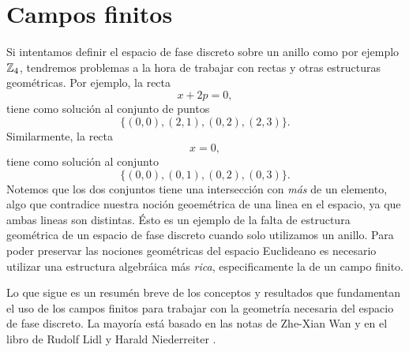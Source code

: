 \section{Campos finitos}
\label{sec:fields}

Si intentamos definir el espacio de fase discreto sobre un
anillo como por ejemplo $\operatorname{\mathbb{Z}}_4$, tendremos problemas a la
hora de trabajar con rectas y otras estructuras geométricas.
Por ejemplo, la recta
\[
  x + 2p = 0,
\]
tiene como solución al conjunto de puntos
\begin{equation}
  \label{eqn:ap_fields_1}
  \{(0,0), (2,1), (0,2), (2,3)\}.
\end{equation} 
Similarmente, la recta 
\[
  x = 0,
\] 
tiene como solución al conjunto
\begin{equation}
  \label{eqn:ap_fields_2}
  \{(0,0), (0,1), (0,2), (0,3)\}.
\end{equation} 
Notemos que los dos conjuntos tiene una intersección con
\textit{más} de un elemento, algo que contradice nuestra
noción geoemétrica de una linea en el espacio, ya que ambas
lineas son distintas. Ésto es un ejemplo de la falta de
estructura geométrica de un espacio de fase discreto cuando
solo utilizamos un anillo. Para poder preservar las nociones
geométricas del espacio Euclideano es necesario utilizar una
estructura algebráica más \textit{rica}, especificamente la
de un campo finito.

Lo que sigue es un resumén breve de los conceptos y
resultados que fundamentan el uso de los campos finitos para
trabajar con la geometría necesaria del espacio de fase
discreto. La mayoría está basado en las notas de Zhe-Xian
Wan \cite{wan} y en el libro de Rudolf Lidl y Harald
Niederreiter \cite{lidl1994}.

